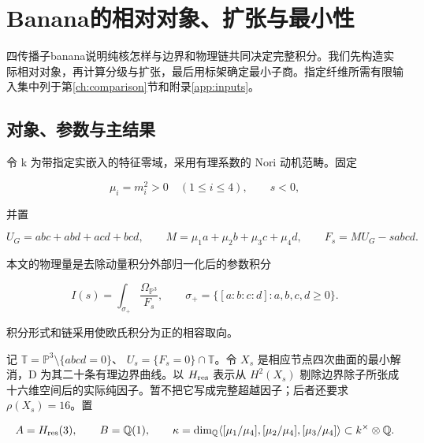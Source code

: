 \documentclass[11pt,a4paper,oneside]{ctexart}
\theoremstyle{cnplain}
\theoremstyle{definition}
\theoremstyle{remark}
\numberwithin{equation}{section}
\begin{document}
\endgroup

\section{Banana的相对对象、扩张与最小性}\label{ch:core}

\begingroup

四传播子banana说明纯核怎样与边界和物理链共同决定完整积分。我们先构造实际相对对象，再计算分级与扩张，最后用标架确定最小子商。指定纤维所需有限输入集中列于第\ref{ch:comparison}节和附录\ref{app:inputs}。

\subsection{对象、参数与主结果}\label{sec:core:1}

令 k 为带指定实嵌入的特征零域，采用有理系数的 Nori 动机范畴。固定

\begin{equation}
\mu_i=m_i^2>0\quad(1\leq i\leq4),\qquad s<0,
\end{equation}

并置

\begin{equation}
U_G=abc+abd+acd+bcd,\qquad
 M=\mu_1a+\mu_2b+\mu_3c+\mu_4d,\qquad
 F_s=M U_G-sabcd.                                      \label{eq:core:1.1}
\end{equation}

本文的物理量是去除动量积分外部归一化后的参数积分

\begin{equation}
I(s)=\int_{\sigma_+}\frac{\Omega_{\mathbb P^3}}{F_s},
 \qquad \sigma_+=\{[a:b:c:d]:a,b,c,d\geq0\}.             \label{eq:core:1.2}
\end{equation}

积分形式和链采用使欧氏积分为正的相容取向。

记 \(\mathbb T=\mathbb P^3\setminus\{abcd=0\}\)、 \(U_s=\{F_s=0\}\cap\mathbb T\)。令 \(X_s\) 是相应节点四次曲面的最小解消，D 为其二十条有理边界曲线。以 \(H_{\rm res}\) 表示从 \(H^2(X_s)\) 剔除边界除子所张成十六维空间后的实际纯因子。暂不把它写成完整超越因子；后者还要求 \(\rho(X_s)=16\)。置

\begin{equation}
A=H_{\rm res}(3),\qquad B=\mathbb Q(1),\qquad
 \kappa=\dim_{\mathbb Q}\langle[\mu_1/\mu_4],
 [\mu_2/\mu_4],[\mu_3/\mu_4]\rangle\subset k^\times\otimes\mathbb Q.
                                                               \label{eq:core:1.3}
\end{equation}
\end{document}
